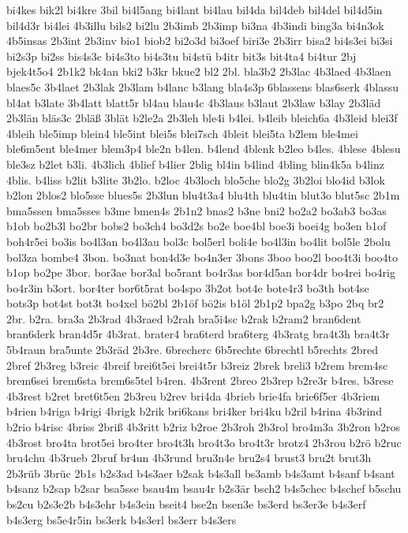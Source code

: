 {bi4kes
bik2l
bi4kre
3bil
bi4l5ang
bi4lant
bi4lau
bil4da
bil4deb
bil4del
bil4d5in
bil4d3r
bi4lei
4b3illu
bils2
bi2lu
2b3imb
2b3imp
bi3na
4b3indi
bing3a
bi4n3ok
4b5insas
2b3int
2b3inv
bio1
biob2
bi2o3d
bi3oef
biri3e
2b3irr
bisa2
bi4s3ei
bi3si
bi2s3p
bi2ss
bis4s3c
bi4s3to
bi4s3tu
bi4stü
b4itr
bit3s
bit4ta4
bi4tur
2bj
bjek4t5o4
2b1k2
bk4an
bki2
b3kr
bkue2
bl2
2bl.
bla3b2
2b3lac
4b3laed
4b3laen
blaes5c
3b4laet
2b3lak
2b3lam
b4lanc
b3lang
bla4s3p
6blassens
blas6serk
4blassu
bl4at
b3late
3b4latt
blatt5r
bl4au
blau4c
4b3laus
b3laut
2b3law
b3lay
2b3läd
2b3län
bläs3c
2bläß
3blät
b2le2a
2b3leh
ble4i
b4lei.
b4leib
bleich6a
4b3leid
blei3f
4bleih
ble5imp
blein4
ble5int
blei5s
blei7sch
4bleit
blei5ta
b2lem
ble4mei
ble6m5ent
ble4mer
blem3p4
ble2n
b4len.
b4lend
4blenk
b2leo
b4les.
4blese
4blesu
ble3sz
b2let
b3li.
4b3lich
4blief
b4lier
2blig
bl4in
b4lind
4bling
blin4k5a
b4linz
4blis.
b4liss
b2lit
b3lite
3b2lo.
b2loc
4b3loch
blo5che
blo2g
3b2loi
blo4id
b3lok
b2lon
2blos2
blo5sse
blues5s
2b3lun
blu4t3a4
blu4th
blu4tin
blut3o
blut5sc
2b1m
bma5ssen
bma5sses
b3me
bmen4s
2b1n2
bnas2
b3ne
bni2
bo2a2
bo3ab3
bo3as
b1ob
bo2b3l
bo2br
bobs2
bo3ch4
bo3d2s
bo2e
boe4bl
boe3i
boei4g
bo3en
b1of
boh4r5ei
bo3is
bo4l3an
bo4l3au
bol3c
bol5erl
boli4e
bo4l3in
bo4lit
bol5le
2bolu
bol3za
bombe4
3bon.
bo3nat
bon4d3e
bo4n3er
3bons
3boo
boo2l
boo4t3i
boo4to
b1op
bo2pe
3bor.
bor3ae
bor3al
bo5rant
bo4r3as
bor4d5an
bor4dr
bo4rei
bo4rig
bo4r3in
b3ort.
bor4ter
bor6t5rat
bo4spo
3b2ot
bot4e
bote4r3
bo3th
bot4se
bots3p
bot4st
bot3t
bo4xel
bö2bl
2b1öf
bö2is
b1öl
2b1p2
bpa2g
b3po
2bq
br2
2br.
b2ra.
bra3a
2b3rad
4b3raed
b2rah
bra5i4sc
b2rak
b2ram2
bran6dent
bran6derk
bran4d5r
4b3rat.
brater4
bra6terd
bra6terg
4b3ratg
bra4t3h
bra4t3r
5b4raun
bra5unte
2b3räd
2b3re.
6brecherc
6b5rechte
6brechtl
b5rechts
2bred
2bref
2b3reg
b3reic
4breif
brei6t5ei
brei4t5r
b3reiz
2brek
breli3
b2rem
brem4sc
brem6sei
brem6sta
brem6s5tel
b4ren.
4b3rent
2breo
2b3rep
b2re3r
b4res.
b3rese
4b3rest
b2ret
bret6t5en
2b3reu
b2rev
bri4da
4brieb
brie4fa
brie6f5er
4b3riem
b4rien
b4riga
b4rigi
4brigk
b2rik
bri6kans
bri4ker
bri4ku
b2ril
b4rina
4b3rind
b2rio
b4risc
4briss
2briß
4b3ritt
b2riz
b2roe
2b3roh
2b3rol
bro4m3a
3b2ron
b2ros
4b3rost
bro4ta
brot5ei
bro4ter
bro4t3h
bro4t3o
bro4t3r
brotz4
2b3rou
b2rö
b2ruc
bru4chu
4b3rueb
2bruf
br4un
4b3rund
bru3n4e
bru2s4
brust3
bru2t
brut3h
2b3rüb
3brüc
2b1s
b2s3ad
b4s3aer
b2sak
b4s3all
bs3amb
b4s3amt
b4sanf
b4sant
b4sanz
b2sap
b2sar
bsa5sse
bsau4m
bsau4r
b2s3är
bsch2
b4s5chec
b4schef
b5schu
bs2cu
b2s3e2b
b4s3ehr
b4s3ein
bseit4
bse2n
bsen3e
bs3erd
bs3er3e
b4s3erf
b4s3erg
bs5e4r5in
bs3erk
b4s3erl
bs3err
b4s3ers
}

